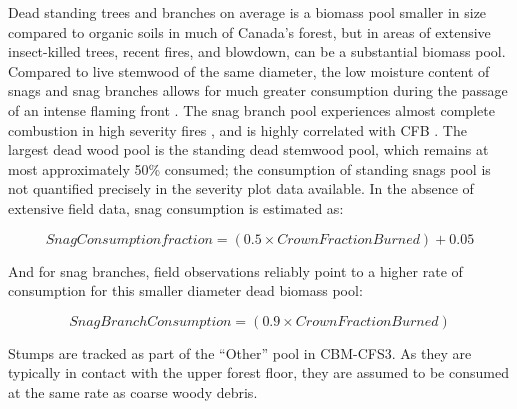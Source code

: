 \documentclass[, manuscript]{copernicus}
\begin{document}
Dead standing trees and branches on average is a biomass pool smaller in
size compared to organic soils in much of Canada's forest, but in areas
of extensive insect-killed trees, recent fires, and blowdown, can be a
substantial biomass pool. Compared to live stemwood of the same
diameter, the low moisture content of snags and snag branches allows for
much greater consumption during the passage of an intense flaming front
\citep{stocks2004}. The snag branch pool experiences almost complete
combustion in high severity fires \citep{talucci2019}, and is highly
correlated with CFB \citep{degroot2022}. The largest dead wood pool is
the standing dead stemwood pool, which remains at most approximately
50\% consumed; the consumption of standing snags pool is not quantified
precisely in the severity plot data available. In the absence of
extensive field data, snag consumption is estimated as:

\begin{equation}
Snag Consumption fraction = \left( 0.5 \times Crown Fraction Burned \right) + 0.05
\end{equation}

And for snag branches, field observations
\citep{talucci2019, degroot2022} reliably point to a higher rate of
consumption for this smaller diameter dead biomass pool:

\begin{equation}
Snag Branch Consumption = \left( 0.9 \times Crown Fraction Burned \right)
\end{equation}

Stumps are tracked as part of the ``Other'' pool in CBM-CFS3. As they
are typically in contact with the upper forest floor, they are assumed
to be consumed at the same rate as coarse woody debris.
\end{document}
